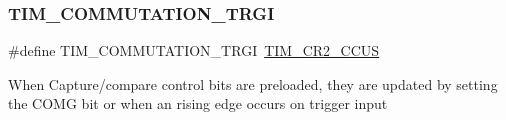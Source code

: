 \subsubsection{\texorpdfstring{TIM\_COMMUTATION\_TRGI}{TIM\_COMMUTATION\_TRGI}}
{\footnotesize\ttfamily \#define T\+I\+M\+\_\+\+C\+O\+M\+M\+U\+T\+A\+T\+I\+O\+N\+\_\+\+T\+R\+GI~\mbox{\hyperlink{group___peripheral___registers___bits___definition_gaf0328c1339b2b1633ef7a8db4c02d0d5}{T\+I\+M\+\_\+\+C\+R2\+\_\+\+C\+C\+US}}}

When Capture/compare control bits are preloaded, they are updated by setting the C\+O\+MG bit or when an rising edge occurs on trigger input 